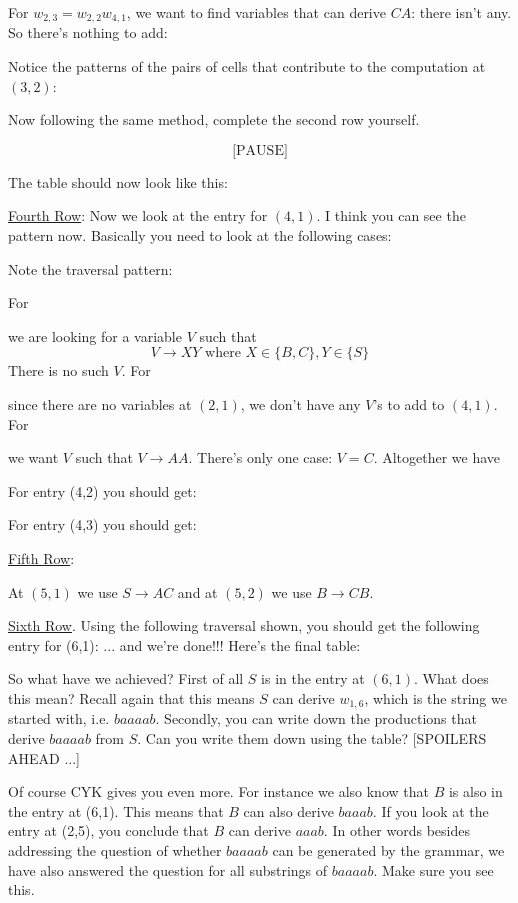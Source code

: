 For $w_{2,3} = w_{2,2}w_{4,1}$, we want to find variables 
that can derive $CA$: there isn't any.
So there's nothing to add:


Notice the patterns of the pairs of cells that contribute to the 
computation at $(3,2)$:


Now following the same method, complete the second row yourself.

\[
  \text{[PAUSE]}
\]

\newpage
The table should now look like this:


\underline{Fourth Row}:
Now we look at the entry for $(4,1)$.
I think you can see the pattern now.
Basically you need to look at the following cases:

Note the traversal pattern:


For

we are looking for a variable $V$ such that
\[
  V \rightarrow XY \text{ where } X \in \{B,C\}, Y \in \{S\}
\]
There is no such $V$.
For

since there are no variables at $(2, 1)$, we don't have any $V$'s to add to $(4,1)$.
For

we want $V$ such that $V \rightarrow AA$. There's only one case: $V = C$.
Altogether we have


For entry (4,2) you should get:


For entry (4,3) you should get:


\underline{Fifth Row}:

At $(5, 1)$ we use $S \rightarrow AC$ and at $(5,2)$ we use $B \rightarrow CB$.

\underline{Sixth Row}.
Using the following traversal shown, you should get the following entry for (6,1):
... and we're done!!! Here's the final table:


So what have we achieved? First of all $S$ is in the entry at $(6,1)$.
What does this mean? 
Recall again that this means $S$ can derive $w_{1,6}$, which is the
string we started with, i.e. $baaaab$.
Secondly, you can write down the productions that derive $baaaab$ from $S$.
Can you write them down using the table? [SPOILERS AHEAD ...]

Of course CYK gives you even more.
For instance we also know that $B$ is also in the entry at (6,1).
This means that $B$ can also derive $baaab$.
If you look at the entry at (2,5), you conclude that $B$ can derive $aaab$.
In other words besides addressing the question of whether $baaaab$ can be
generated by the grammar, we have also answered the question for all
substrings of $baaaab$.
Make sure you see this.

